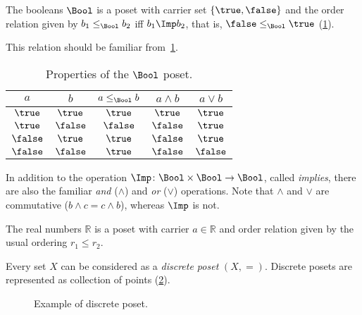 \begin{example}[Booleans]\label{ex:bool}
The booleans $\Bool$ is a poset with carrier set $\{\true,\false\}$ and the order relation given by $b_1 \leq_\Bool b_2$ iff $b_1 \Imp b_2$, that is, $\false \leq_\Bool \true$ (\cref{fig:boolean}).

\begin{figure}[h!]
   \centering
   \caption{\label{fig:boolean}}
\end{figure}

This relation should be familiar from~\cref{tab:boolposet}.
\begin{table}[h!]
\begin{center}
\begin{tabular}{cc|ccc}
$a$ & $b$ & $a \leq_\Bool b$ & $a \wedge b$ & $a \vee b$ \\ \hline
$\true$&$\true$&$\true$&$\true$&$\true$\\
$\true$&$\false$&$\false$&$\false$&$\true$\\
$\false$&$\true$&$\true$&$\false$&$\true$\\
$\false$&$\false$&$\true$&$\false$&$\false$
\end{tabular}
\end{center}
\caption{Properties of the $\Bool$ poset. \label{tab:boolposet}}
\end{table}
In addition to the operation $\Imp\colon\Bool\times \Bool\to\Bool$, called \emph{implies}, there are also the familiar \emph{and} ($\wedge$) and \emph{or} ($\vee$) operations. Note that $\wedge$ and $\vee$ are commutative ($b\wedge c = c\wedge b$), whereas $\Imp$ is not.
\end{example}




\begin{example}[Reals]
The real numbers $\mathbb{R}$ is a poset with carrier $a\in \mathbb{R}$ and order relation given by the usual ordering $r_1 \leq r_2$.
\end{example}


\begin{example}
\label{ex:discreteposet}
Every set $X$ can be considered as a \emph{discrete poset} $(X,=)$. Discrete posets are represented as collection of points (\cref{fig:discretepos}). 

\begin{figure}[h!]
   \centering
   \caption{Example of discrete poset. \label{fig:discretepos}}
\end{figure}
\end{example}

